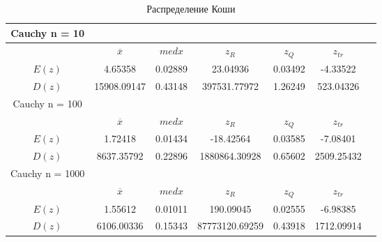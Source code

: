 \documentclass[12pt,a4paper]{scrartcl}
\begin{document}
\begin{table}[H]
  \centering
  \begin{tabular}{ | c | c | c | c | c | c | c | }
	\hline
	Cauchy n = 10 & & & & &  \\ \hline
         & $\overline x$& $med x$& $z_R $ & $z_Q $  &  $z_{tr}$  \\ \hline
         $E(z)$ & 4.65358 & 0.02889 & 23.04936 & 0.03492 & -4.33522 \\ \hline
         $D(z)$ & 15908.09147 & 0.43148 & 397531.77972 & 1.26249 & 523.04326 \\ \hline

Cauchy n = 100 & & & & &  \\ \hline
         & $\overline x$& $med x$& $z_R $ & $z_Q $  &  $z_{tr}$  \\ \hline
         $E(z)$ & 1.72418 & 0.01434 & -18.42564 & 0.03585 & -7.08401 \\ \hline
         $D(z)$ & 8637.35792 & 0.22896 & 1880864.30928 & 0.65602 & 2509.25432 \\ \hline

Cauchy n = 1000 & & & & &  \\ \hline
         & $\overline x$& $med x$& $z_R $ & $z_Q $  &  $z_{tr}$  \\ \hline
         $E(z)$ & 1.55612 & 0.01011 & 190.09045 & 0.02555 & -6.98385 \\ \hline
         $D(z)$ & 6106.00336 & 0.15343 & 87773120.69259 & 0.43918 & 1712.09914 \\ \hline
	\end{tabular}
  \label{table:cauchy_table}
\caption{Распределение Коши}
\end{table}
\end{document}
